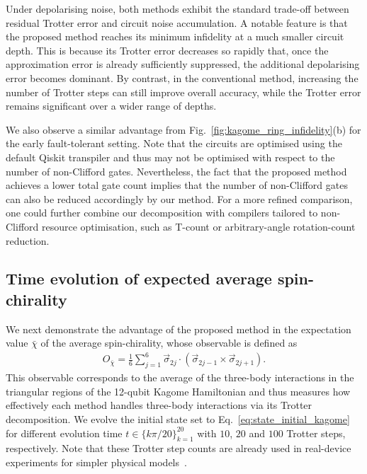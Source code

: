 \documentclass[aps,showpacs,amsmath,amssymb,twocolumn,prx,longbibliography,superscriptaddress,notitlepage,floatfix,10pt]{revtex4-2}
\begin{document}
Under depolarising noise, both methods exhibit the standard trade-off between residual Trotter error and circuit noise accumulation.
A notable feature is that the proposed method reaches its minimum infidelity at a much smaller circuit depth.
This is because its Trotter error decreases so rapidly that, once the approximation error is already sufficiently suppressed, the additional depolarising error becomes dominant.
By contrast, in the conventional method, increasing the number of Trotter steps can still improve overall accuracy, while the Trotter error remains significant over a wider range of depths.

We also observe a similar advantage from Fig.~\ref{fig:kagome_ring_infidelity}(b) for the early fault-tolerant setting.
Note that the circuits are optimised using the default Qiskit transpiler and thus may not be optimised with respect to the number of non-Clifford gates.
Nevertheless, the fact that the proposed method achieves a lower total gate count implies that the number of non-Clifford gates can also be reduced accordingly by our method.
For a more refined comparison, one could further combine our decomposition with compilers tailored to non-Clifford resource optimisation, such as T-count or arbitrary-angle rotation-count reduction.


\subsection{Time evolution of expected average spin-chirality}

We next demonstrate the advantage of the proposed method in the expectation value $\bar{\chi}$ of the average spin-chirality, whose observable is defined as
\begin{equation}
\begin{split}
    O_{\bar{\chi}} = \frac{1}{6}\sum_{j=1}^{6} \vec{\sigma}_{2j}\cdot\left(\vec{\sigma}_{2j-1}\times\vec{\sigma}_{2j+1}\right).
\end{split}
\end{equation}
This observable corresponds to the average of the three-body interactions in the triangular regions of the 12-qubit Kagome Hamiltonian and thus measures how effectively each method handles three-body interactions via its Trotter decomposition.
We evolve the initial state set to Eq.~\eqref{eq:state_initial_kagome} for different evolution time $t\in\{k\pi/20\}_{k=1}^{20}$ with $10$, $20$ and $100$ Trotter steps, respectively.
Note that these Trotter step counts are already used in real-device experiments for simpler physical models~\cite{Chowdhury2024Enhancing}.
\end{document}
